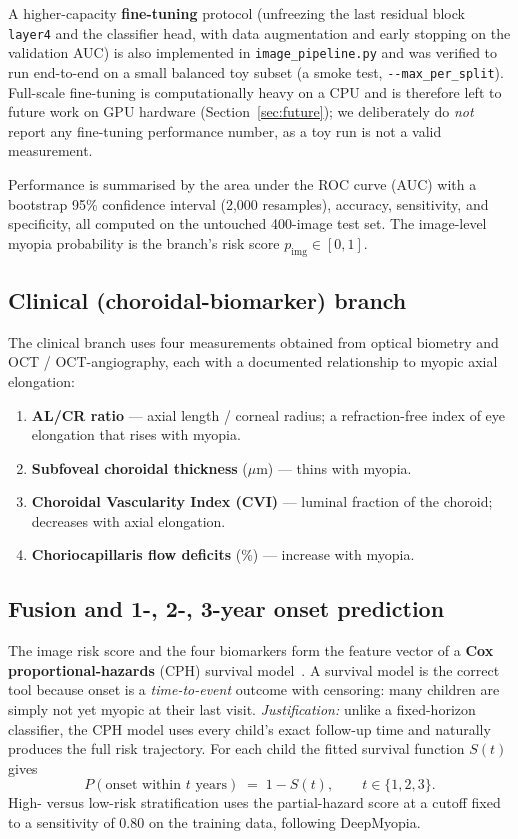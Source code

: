 \documentclass[11pt]{article}
\begin{document}
A higher-capacity \textbf{fine-tuning} protocol (unfreezing the last residual
block \texttt{layer4} and the classifier head, with data augmentation and early
stopping on the validation AUC) is also implemented in \texttt{image\_pipeline.py}
and was verified to run end-to-end on a small balanced toy subset (a smoke test,
\texttt{-{}-max\_per\_split}). Full-scale fine-tuning is computationally heavy on a
CPU and is therefore left to future work on GPU hardware
(Section~\ref{sec:future}); we deliberately do \emph{not} report any fine-tuning
performance number, as a toy run is not a valid measurement.

Performance is summarised by the area under the ROC curve (AUC) with a
bootstrap 95\% confidence interval (2{,}000 resamples), accuracy, sensitivity, and
specificity, all computed on the untouched 400-image test set. The image-level
myopia probability is the branch's risk score $p_{\mathrm{img}}\in[0,1]$.

\subsection{Clinical (choroidal-biomarker) branch}\label{sec:clinical}
The clinical branch uses four measurements obtained from optical biometry and
OCT / OCT-angiography, each with a documented relationship to myopic axial
elongation:
\begin{enumerate}[leftmargin=1.4em,itemsep=1pt]
  \item \textbf{AL/CR ratio} --- axial length / corneal radius; a refraction-free
  index of eye elongation that rises with myopia.
  \item \textbf{Subfoveal choroidal thickness} ($\mu$m) --- thins with myopia.
  \item \textbf{Choroidal Vascularity Index (CVI)} --- luminal fraction of the
  choroid; decreases with axial elongation.
  \item \textbf{Choriocapillaris flow deficits} (\%) --- increase with myopia.
\end{enumerate}

\subsection{Fusion and 1-, 2-, 3-year onset prediction}
The image risk score and the four biomarkers form the feature vector of a
\textbf{Cox proportional-hazards} (CPH) survival model~\cite{cox}. A survival model
is the correct tool because onset is a \emph{time-to-event} outcome with
censoring: many children are simply not yet myopic at their last visit.
\emph{Justification:} unlike a fixed-horizon classifier, the CPH model uses every
child's exact follow-up time and naturally produces the full risk trajectory. For
each child the fitted survival function $S(t)$ gives
\begin{equation}
P(\text{onset within } t \text{ years}) \;=\; 1 - S(t), \qquad t \in \{1,2,3\}.
\end{equation}
High- versus low-risk stratification uses the partial-hazard score at a cutoff
fixed to a sensitivity of 0.80 on the training data, following DeepMyopia.
\end{document}
